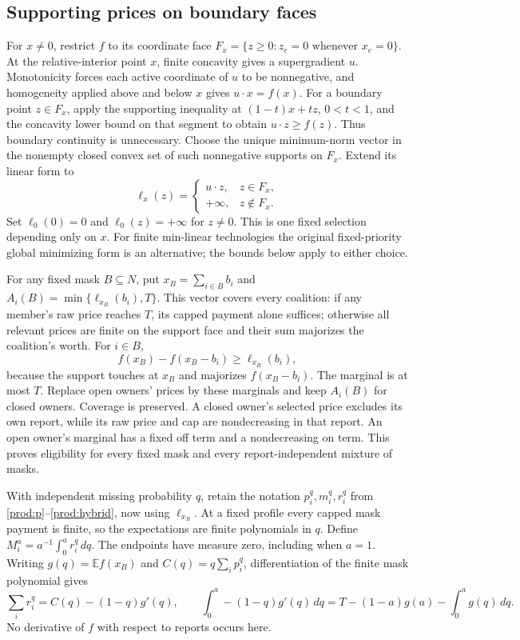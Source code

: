 \documentclass[11pt]{article}
\theoremstyle{definition}\newtheorem{definition}[theorem]{Definition}
\theoremstyle{remark}\newtheorem{remark}[theorem]{Remark}
\newcommand{\E}{\mathbb E}
\begin{document}
\subsection{Supporting prices on boundary faces}
For $x\ne0$, restrict $f$ to its coordinate face
$F_x=\{z\ge0:z_e=0\text{ whenever }x_e=0\}$.
At the relative-interior point $x$, finite concavity gives a supergradient $u$.
Monotonicity forces each active coordinate of $u$ to be nonnegative, and
homogeneity applied above and below $x$ gives $u\cdot x=f(x)$.
For a boundary point $z\in F_x$, apply the supporting inequality at
$(1-t)x+tz$, $0<t<1$, and the concavity lower bound on that segment to obtain
$u\cdot z\ge f(z)$. Thus boundary continuity is unnecessary.
Choose the unique minimum-norm vector in the nonempty closed convex set of
such nonnegative supports on $F_x$. Extend its linear form to
\[
 \ell_x(z)=\begin{cases}u\cdot z,&z\in F_x,\\+\infty,&z\notin F_x.
 \end{cases}
\]
Set $\ell_0(0)=0$ and $\ell_0(z)=+\infty$ for $z\ne0$.
This is one fixed selection depending only on $x$. For finite min-linear
technologies the original fixed-priority global minimizing form is an
alternative; the bounds below apply to either choice.

For any fixed mask $B\subseteq N$, put $x_B=\sum_{i\in B}b_i$ and
$A_i(B)=\min\{\ell_{x_B}(b_i),T\}$. This vector covers every coalition:
if any member's raw price reaches $T$, its capped payment alone suffices;
otherwise all relevant prices are finite on the support face and their sum
majorizes the coalition's worth. For $i\in B$,
\[
 f(x_B)-f(x_B-b_i)\ge \ell_{x_B}(b_i),
\]
because the support touches at $x_B$ and majorizes $f(x_B-b_i)$.
The marginal is at most $T$. Replace open owners' prices by these marginals
and keep $A_i(B)$ for closed owners. Coverage is preserved. A closed owner's
selected price excludes its own report, while its raw price and cap are
nondecreasing in that report. An open owner's marginal has a fixed off term
and a nondecreasing on term. This proves eligibility for every fixed mask
and every report-independent mixture of masks.

With independent missing probability $q$, retain the notation $p_i^q,m_i^q,r_i^q$
from \eqref{prod:p}--\eqref{prod:hybrid}, now using $\ell_{x_B}$.
At a fixed profile every capped mask payment is finite, so the expectations
are finite polynomials in $q$. Define $M_i^a=a^{-1}\int_0^a r_i^q\,dq$.
The endpoints have measure zero, including when $a=1$.
Writing $g(q)=\E f(x_B)$ and $C(q)=q\sum_i p_i^q$, differentiation of the
finite mask polynomial gives
\begin{equation}\label{general:endpoint}
 \sum_i r_i^q=C(q)-(1-q)g'(q),\qquad
 \int_0^a-(1-q)g'(q)\,dq
 =T-(1-a)g(a)-\int_0^a g(q)\,dq.
\end{equation}
No derivative of $f$ with respect to reports occurs here.
\end{document}
